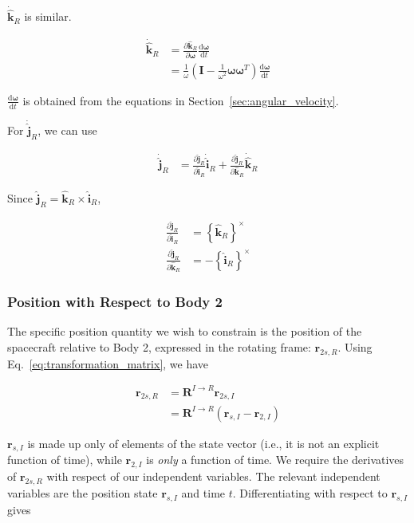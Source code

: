 \documentclass[]{article}
\newcommand{\vb}[1]{\bm{#1}} %
\newcommand{\vbh}[1]{\hat{\bm{#1}}} %
\newcommand{\ddt}[1]{\frac{\mathrm{d} #1}{\mathrm{d} t}} %
\newcommand{\pd}[2]{\frac{\partial #1}{\partial #2}} %
\newcommand{\crossmat}[1]{\left\{ {#1} \right\}^{\times}} %
\newcommand{\vbr}[0]{\vb{r}}
\begin{document}
$\dot{\vbh{k}}_R$ is similar.

\begin{align}
\dot{\vbh{k}}_R &= \pd{\vbh{k}_R}{\vb{\omega}} \ddt{\vb{\omega}} \\
&= \frac{1}{\omega} \left( \vb{I} - \frac{1}{\omega^2} \vb{\omega} \vb{\omega}^T \right) \ddt{\vb{\omega}}
\end{align}

\noindent $\ddt{\vb{\omega}}$ is obtained from the equations in Section~\ref{sec:angular_velocity}.

For $\dot{\vbh{j}}_R$, we can use

\begin{align}
	\dot{\vbh{j}}_R &= \pd{\vbh{j}_R}{\vbh{i}_R} \dot{\vbh{i}}_R + \pd{\vbh{j}_R}{\vbh{k}_R} \dot{\vbh{k}}_R
\end{align}

\noindent Since $\vbh{j}_R = \vbh{k}_R \times \vbh{i}_R$,

\begin{align}
	\pd{\vbh{j}_R}{\vbh{i}_R} &= \crossmat{\vbh{k}_R} \\
	\pd{\vbh{j}_R}{\vbh{k}_R} &= -\crossmat{\vbh{i}_R}
\end{align}

\subsubsection{Position with Respect to Body 2}
\label{sec:position_wrt_body2}

The specific position quantity we wish to constrain is the position of the spacecraft relative to Body 2, expressed in the rotating frame: $\vbr_{2s, R}$. Using Eq.~\eqref{eq:transformation_matrix}, we have

\begin{align}
	\vb{r}_{2s, R} &= \vb{R}^{I \rightarrow R} \vb{r}_{2s,I} \\
	&= \vb{R}^{I \rightarrow R} \left( \vbr_{s,I} - \vbr_{2,I} \right)
\end{align}

\noindent $\vbr_{s,I}$ is made up only of elements of the state vector (i.e., it is not an explicit function of time), while $\vbr_{2,I}$ is \emph{only} a function of time. We require the derivatives of $\vb{r}_{2s, R}$ with respect of our independent variables. The relevant independent variables are the position state $\vbr_{s,I}$ and time $t$. Differentiating with respect to $\vbr_{s,I}$ gives
\end{document}

